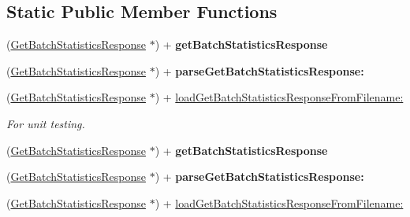\subsection*{Static Public Member Functions}
\begin{DoxyCompactItemize}
\item 
\hypertarget{interface_get_batch_statistics_response_a04b2ce59dfb05054d3b64a9b50474b6c}{
(\hyperlink{interface_get_batch_statistics_response}{GetBatchStatisticsResponse} $\ast$) + {\bfseries getBatchStatisticsResponse}}
\label{interface_get_batch_statistics_response_a04b2ce59dfb05054d3b64a9b50474b6c}

\item 
\hypertarget{interface_get_batch_statistics_response_a5629852beac6c88be8c7c311b1cb399e}{
(\hyperlink{interface_get_batch_statistics_response}{GetBatchStatisticsResponse} $\ast$) + {\bfseries parseGetBatchStatisticsResponse:}}
\label{interface_get_batch_statistics_response_a5629852beac6c88be8c7c311b1cb399e}

\item 
\hypertarget{interface_get_batch_statistics_response_a8a2b7c209f329ac13e0b200237c58461}{
(\hyperlink{interface_get_batch_statistics_response}{GetBatchStatisticsResponse} $\ast$) + \hyperlink{interface_get_batch_statistics_response_a8a2b7c209f329ac13e0b200237c58461}{loadGetBatchStatisticsResponseFromFilename:}}
\label{interface_get_batch_statistics_response_a8a2b7c209f329ac13e0b200237c58461}

\begin{DoxyCompactList}\small\item\em For unit testing. \item\end{DoxyCompactList}\item 
\hypertarget{interface_get_batch_statistics_response_a04b2ce59dfb05054d3b64a9b50474b6c}{
(\hyperlink{interface_get_batch_statistics_response}{GetBatchStatisticsResponse} $\ast$) + {\bfseries getBatchStatisticsResponse}}
\label{interface_get_batch_statistics_response_a04b2ce59dfb05054d3b64a9b50474b6c}

\item 
\hypertarget{interface_get_batch_statistics_response_a5629852beac6c88be8c7c311b1cb399e}{
(\hyperlink{interface_get_batch_statistics_response}{GetBatchStatisticsResponse} $\ast$) + {\bfseries parseGetBatchStatisticsResponse:}}
\label{interface_get_batch_statistics_response_a5629852beac6c88be8c7c311b1cb399e}

\item 
\hypertarget{interface_get_batch_statistics_response_a8a2b7c209f329ac13e0b200237c58461}{
(\hyperlink{interface_get_batch_statistics_response}{GetBatchStatisticsResponse} $\ast$) + \hyperlink{interface_get_batch_statistics_response_a8a2b7c209f329ac13e0b200237c58461}{loadGetBatchStatisticsResponseFromFilename:}}
\label{interface_get_batch_statistics_response_a8a2b7c209f329ac13e0b200237c58461}


\end{DoxyCompactItemize}
